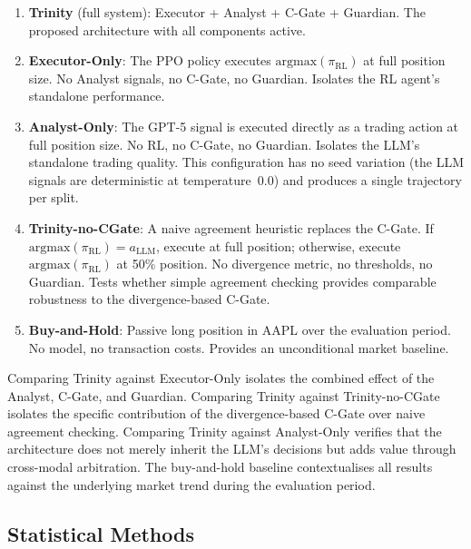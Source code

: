 \begin{enumerate}
    \item \textbf{Trinity} (full system): Executor + Analyst + C-Gate +
    Guardian. The proposed architecture with all components active.

    \item \textbf{Executor-Only}: The PPO policy executes
    $\text{argmax}(\pi_{\text{RL}})$ at full position size. No Analyst signals,
    no C-Gate, no Guardian. Isolates the RL agent's standalone performance.

    \item \textbf{Analyst-Only}: The GPT-5 signal is executed directly as a
    trading action at full position size. No RL, no C-Gate, no Guardian.
    Isolates the LLM's standalone trading quality. This configuration has no
    seed variation (the LLM signals are deterministic at temperature~0.0) and
    produces a single trajectory per split.

    \item \textbf{Trinity-no-CGate}: A naive agreement heuristic replaces the
    C-Gate. If $\text{argmax}(\pi_{\text{RL}}) = a_{\text{LLM}}$, execute at
    full position; otherwise, execute $\text{argmax}(\pi_{\text{RL}})$ at 50\%
    position. No divergence metric, no thresholds, no Guardian. Tests whether
    simple agreement checking provides comparable robustness to the
    divergence-based C-Gate.

    \item \textbf{Buy-and-Hold}: Passive long position in AAPL over the
    evaluation period. No model, no transaction costs. Provides an
    unconditional market baseline.
\end{enumerate}

Comparing Trinity against Executor-Only isolates the combined effect of the
Analyst, C-Gate, and Guardian. Comparing Trinity against Trinity-no-CGate
isolates the specific contribution of the divergence-based C-Gate over naive
agreement checking. Comparing Trinity against Analyst-Only verifies that the
architecture does not merely inherit the LLM's decisions but adds value through
cross-modal arbitration. The buy-and-hold baseline contextualises all results
against the underlying market trend during the evaluation period.

\subsection{Statistical Methods} \label{sec:statistical_methods}

